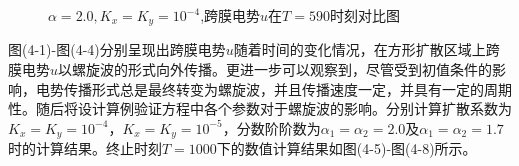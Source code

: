 \documentclass[twoside,UTF8]{nputhesis}
\begin{document}
\begin{figure}[htbp]
	
	\setlength{\abovecaptionskip}{-0.2cm} %
	\caption{$\alpha = 2.0,K_{x} = K_{y} = {10}^{-4}$,跨膜电势$u$在$T=590$时刻对比图}
	\label{fig:1b}
	\vspace{-0.5cm} %
		
\end{figure}

图(4-1)-图(4-4)分别呈现出跨膜电势$u$随着时间的变化情况，在方形扩散区域上跨膜电势$u$以螺旋波的形式向外传播。更进一步可以观察到，尽管受到初值条件的影响，电势传播形式总是最终转变为螺旋波，并且传播速度一定，并具有一定的周期性。随后将设计算例验证方程中各个参数对于螺旋波的影响。分别计算扩散系数为${{K}_{x}}={{K}_{y}}={{10}^{-4}}$，${{K}_{x}}={{K}_{y}}={{10}^{-5}}$，分数阶阶数为${{\alpha }_{1}}={{\alpha }_{2}}=2.0$及${{\alpha }_{1}}={{\alpha }_{2}}=1.7$时的计算结果。终止时刻$T=1000$下的数值计算结果如图(4-5)-图(4-8)所示。
\end{document}
